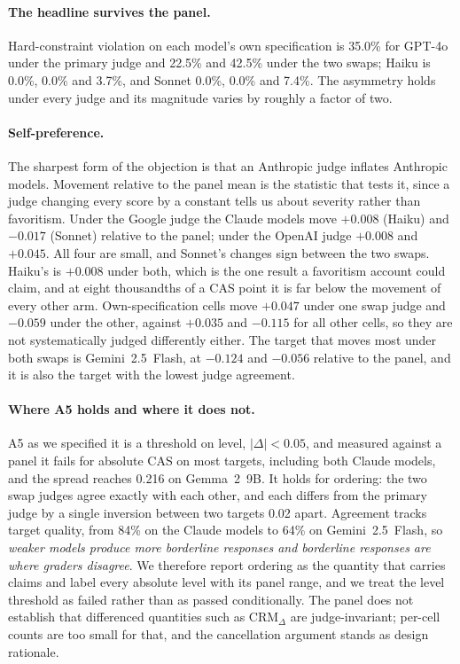 \documentclass{article}
\begin{document}
\paragraph{The headline survives the panel.}
Hard-constraint violation on each model's own specification is 35.0\% for GPT-4o under the
primary judge and 22.5\% and 42.5\% under the two swaps; Haiku is 0.0\%, 0.0\% and 3.7\%, and
Sonnet 0.0\%, 0.0\% and 7.4\%. The asymmetry holds under every judge and its magnitude varies by
roughly a factor of two.

\paragraph{Self-preference.}
The sharpest form of the objection is that an Anthropic judge inflates Anthropic models. Movement
relative to the panel mean is the statistic that tests it, since a judge changing every score by
a constant tells us about severity rather than favoritism. Under the Google judge the Claude
models move $+0.008$ (Haiku) and $-0.017$ (Sonnet) relative to the panel; under the OpenAI
judge $+0.008$ and $+0.045$. All four are small, and Sonnet's changes sign between the two
swaps. Haiku's is $+0.008$ under both, which is the one result a favoritism account could claim,
and at eight thousandths of a CAS point it is far below the movement of every other arm. Own-specification cells move $+0.047$ under one swap judge
and $-0.059$ under the other, against $+0.035$ and $-0.115$ for all other cells, so they are not
systematically judged differently either. The target that moves most under both swaps is
Gemini~2.5~Flash, at $-0.124$ and $-0.056$ relative to the panel, and it is also the target with
the lowest judge agreement.

\paragraph{Where A5 holds and where it does not.}
A5 as we specified it is a threshold on level, $|\Delta| < 0.05$, and measured against a panel
it fails for absolute CAS on most targets, including both Claude models, and the spread reaches
0.216 on Gemma~2~9B. It holds for ordering: the two swap judges agree exactly with each other,
and each differs from the primary judge by a single inversion between two targets 0.02 apart. Agreement tracks target quality, from 84\% on the
Claude models to 64\% on Gemini~2.5~Flash, so \emph{weaker models produce more borderline
responses and borderline responses are where graders disagree}. We therefore report ordering as
the quantity that carries claims and label every absolute level with its panel range, and we
treat the level threshold as failed rather than as passed conditionally. The panel does not
establish that differenced quantities such as $\text{CRM}_\Delta$ are judge-invariant; per-cell
counts are too small for that, and the cancellation argument stands as design rationale.
\end{document}
